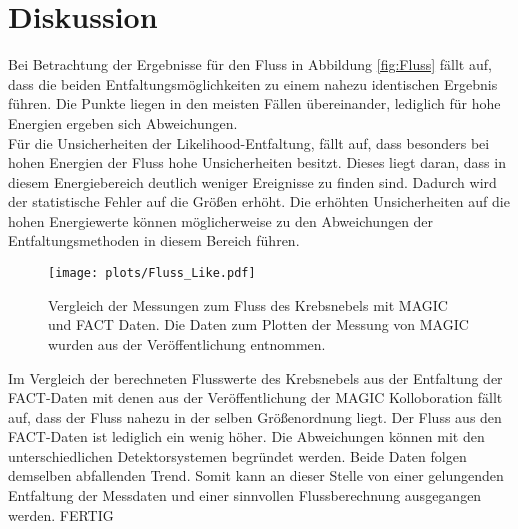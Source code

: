 \section{Diskussion}
Bei Betrachtung der Ergebnisse für den Fluss in Abbildung \ref{fig:Fluss} fällt auf, dass die beiden Entfaltungsmöglichkeiten zu einem nahezu identischen Ergebnis führen. Die Punkte liegen in den meisten Fällen übereinander, lediglich für hohe Energien ergeben sich Abweichungen.\\
Für die Unsicherheiten der Likelihood-Entfaltung, fällt auf, dass besonders bei hohen Energien der Fluss hohe Unsicherheiten besitzt. Dieses liegt daran, dass in diesem Energiebereich deutlich weniger Ereignisse zu finden sind. Dadurch wird der statistische Fehler auf die Größen erhöht. Die erhöhten Unsicherheiten auf die hohen Energiewerte können möglicherweise zu den Abweichungen der Entfaltungsmethoden in diesem Bereich führen.
\begin{figure}
	\texttt{[image: plots/Fluss\_Like.pdf]}
	\caption{Vergleich der Messungen zum Fluss des Krebsnebels mit MAGIC und FACT Daten. Die Daten zum Plotten der Messung von MAGIC wurden aus der Veröffentlichung \cite{Aleksic:2014jva} entnommen.}
	\label{fig:VGL}
\end{figure}
\FloatBarrier
Im Vergleich der berechneten Flusswerte des Krebsnebels aus der Entfaltung der FACT-Daten mit denen aus der Veröffentlichung \cite{Aleksic:2014jva} der MAGIC Kolloboration fällt auf, dass der Fluss nahezu in der selben Größenordnung liegt. Der Fluss aus den FACT-Daten ist lediglich ein wenig höher. Die Abweichungen können mit den unterschiedlichen Detektorsystemen begründet werden. Beide Daten folgen demselben abfallenden Trend. Somit kann an dieser Stelle von einer gelungenden Entfaltung der Messdaten und einer sinnvollen Flussberechnung ausgegangen werden. FERTIG
